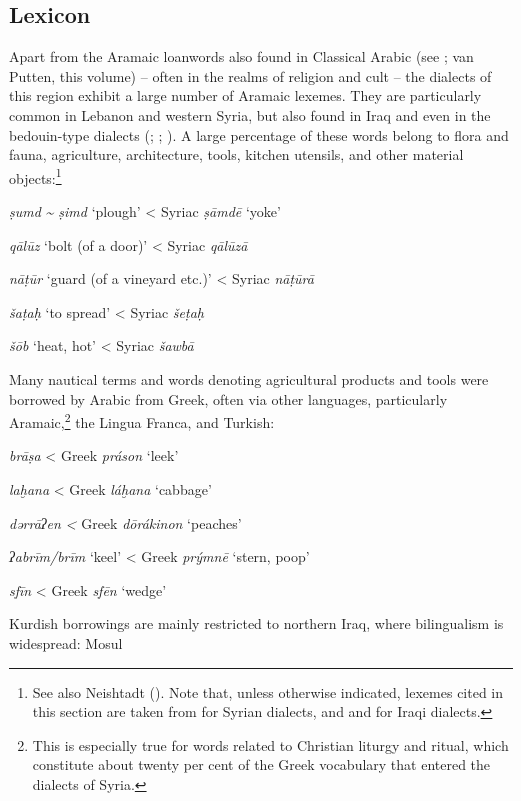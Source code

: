 \documentclass[output=paper]{langsci/langscibook}
\begin{document}
  \subsection{Lexicon} 
Apart from the Aramaic loanwords also found in Classical Arabic (see \citealt{Retsö2011}; van Putten, this volume) – often in the realms of religion and cult – the dialects of this region exhibit a large number of Aramaic lexemes. They are particularly common in Lebanon and western Syria, but also found in Iraq and even in the bedouin-type dialects (\citealt{Féghali1918}; \citealt{Borg2004}; \citeyear{Borg2008}). A large percentage of these words belong to flora and fauna, agriculture, architecture, tools, kitchen utensils, and other material objects:\footnote{See also Neishtadt (\citeyear[282]{Neishtadt2015}). Note that, unless otherwise indicated, lexemes cited in this section are taken from \citet{Barthélemy1935} for Syrian dialects, and \citet{WoodheadBeene1967} and \citet{alBakri1972} for Iraqi dialects.}

\ea
\textit{ṣumd} \textit{{\textasciitilde} ṣimd} ‘plough’ < Syriac \textit{ṣāmdē} ‘yoke’

\textit{qālūz} ‘bolt (of a door)’ < Syriac \textit{qālūzā}

\textit{nāṭūr} ‘guard (of a vineyard etc.)’ < Syriac \textit{nāṭūrā}

\textit{šaṭaḥ} ‘to spread’ < Syriac \textit{šeṭaḥ}

\textit{šōb} ‘heat, hot’ < Syriac \textit{šawbā}
\z

Many nautical terms and words denoting agricultural products and tools were borrowed by Arabic from Greek, often via other languages, particularly Aramaic,\footnote{This is especially true for words related to Christian liturgy and ritual, which constitute about twenty per cent of the Greek vocabulary that entered the dialects of Syria.} the Lingua Franca, and Turkish: 

\ea
\textit{brāṣa} < Greek \textit{práson} ‘leek’ 

\textit{laḫana} < Greek \textit{láḫana} ‘cabbage’

\textit{dərrāʔen} \textit{<} Greek \textit{dōrákinon} ‘peaches’

\textit{ʔabrīm/brīm} ‘keel’ < Greek \textit{prýmnē} ‘stern, poop’

\textit{sfīn} < Greek \textit{sfēn} ‘wedge’
\z

Kurdish borrowings are mainly restricted to northern Iraq, where bilingualism is widespread: 
\ea
Mosul
\end{document}
